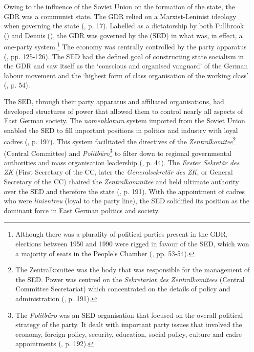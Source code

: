 Owing to the influence of the Soviet Union on the formation of the state, the GDR was a communist state. The GDR relied on a Marxist-Leninist ideology when governing the state (\cite{grixcooke2002}, p. 17). Labelled as a dictatorship by both Fullbrook (\citeyear{fullbrook1995}) and Dennis (\citeyear{dennis2000}), the GDR was governed by the (SED) in what was, in effect, a one-party system.\footnote{Although there was a plurality of political parties present in the GDR, elections between 1950 and 1990 were rigged in favour of the SED, which won a majority of seats in the People’s Chamber (\cite{dennis2000}, pp. 53-54).}  The economy was centrally controlled by the party apparatus (\cite{quint2012}, pp. 125-126). The SED had the defined goal of constructing state socialism in the GDR and saw itself as the ‘conscious and organised vanguard’ of the German labour movement and the ‘highest form of class organisation of the working class’ (\cite{dennis2000}, p. 54).

The SED, through their party apparatus and affiliated organisations, had developed structures of power that allowed them to control nearly all aspects of East German society. The \textit{nomenklatura} system imported from the Soviet Union enabled the SED to fill important positions in politics and industry with loyal cadres (\cite{dennis2000}, p. 197). This system facilitated the directives of the \textit{Zentralkomitee}\footnote{The Zentralkomitee was the body that was responsible for the management of the SED. Power was centred on the \textit{Sekretariat des Zentralkomitees} (Central Committee Secretariat) which concentrated on the details of policy and administration (\cite{dennis2000}, p. 191).} (Central Committee) and \textit{Politbüro}\footnote{The \textit{Politbüro} was an SED organisation that focused on the overall political strategy of the party. It dealt with important party issues that involved the economy, foreign policy, security, education, social policy, culture and cadre appointments (\cite{dennis2000}, p. 192).} to filter down to regional governmental authorities and mass organisation leadership (\cite{fullbrook1995}, p. 44). The \textit{Erster Sekretär des ZK} (First Secretary of the CC, later the \textit{Generalsekretär des ZK}, or General Secretary of the CC) chaired the \textit{Zentralkommitee} and held ultimate authority over the SED and therefore the state (\cite{dennis2000}, p. 191). With the appointment of cadres who were \textit{linientreu} (loyal to the party line), the SED solidified its position as the dominant force in East German politics and society.

